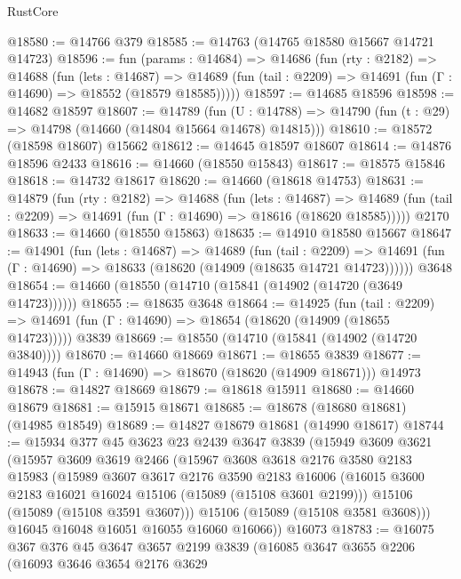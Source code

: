 \begin{lexlean}{RustCore}
\begin{coremodule}
@18580 := @14766 @379
@18585 := @14763 (@14765 @18580 @15667 @14721 @14723)
@18596 := fun (params : @14684) =>
  @14686
    (fun (rty : @2182) =>
    @14688
      (fun (lets : @14687) =>
      @14689 (fun (tail : @2209) => @14691 (fun (Γ : @14690) => @18552 (@18579 @18585)))))
@18597 := @14685 @18596
@18598 := @14682 @18597
@18607 := @14789
    (fun (U : @14788) => @14790 (fun (t : @29) => @14798 (@14660 (@14804 @15664 @14678) @14815)))
@18610 := @18572 (@18598 @18607) @15662
@18612 := @14645 @18597 @18607
@18614 := @14876 @18596 @2433
@18616 := @14660 (@18550 @15843)
@18617 := @18575 @15846
@18618 := @14732 @18617
@18620 := @14660 (@18618 @14753)
@18631 := @14879
    (fun (rty : @2182) =>
    @14688
      (fun (lets : @14687) =>
      @14689 (fun (tail : @2209) => @14691 (fun (Γ : @14690) => @18616 (@18620 @18585)))))
    @2170
@18633 := @14660 (@18550 @15863)
@18635 := @14910 @18580 @15667
@18647 := @14901
    (fun (lets : @14687) =>
    @14689
      (fun (tail : @2209) =>
      @14691 (fun (Γ : @14690) => @18633 (@18620 (@14909 (@18635 @14721 @14723))))))
    @3648
@18654 := @14660 (@18550 (@14710 (@15841 (@14902 (@14720 (@3649 @14723))))))
@18655 := @18635 @3648
@18664 := @14925
    (fun (tail : @2209) => @14691 (fun (Γ : @14690) => @18654 (@18620 (@14909 (@18655 @14723)))))
    @3839
@18669 := @18550 (@14710 (@15841 (@14902 (@14720 @3840))))
@18670 := @14660 @18669
@18671 := @18655 @3839
@18677 := @14943 (fun (Γ : @14690) => @18670 (@18620 (@14909 @18671))) @14973
@18678 := @14827 @18669
@18679 := @18618 @15911
@18680 := @14660 @18679
@18681 := @15915 @18671
@18685 := @18678 (@18680 @18681) (@14985 @18549)
@18689 := @14827 @18679 @18681 (@14990 @18617)
@18744 := @15934
    @377
    @45
    @3623
    @23
    @2439
    @3647
    @3839
    (@15949
      @3609
      @3621
      (@15957
        @3609
        @3619
        @2466
        (@15967
          @3608
          @3618
          @2176
          @3580
          @2183
          @15983
          (@15989
            @3607
            @3617
            @2176
            @3590
            @2183
            @16006
            (@16015 @3600 @2183 @16021 @16024 @15106 (@15089 (@15108 @3601 @2199)))
            @15106
            (@15089 (@15108 @3591 @3607)))
          @15106
          (@15089 (@15108 @3581 @3608)))
        @16045
        @16048
        @16051
        @16055
        @16060
        @16066))
    @16073
@18783 := @16075
    @367
    @376
    @45
    @3647
    @3657
    @2199
    @3839
    (@16085
      @3647
      @3655
      @2206
      (@16093
        @3646
        @3654
        @2176
        @3629

\end{coremodule}
\end{lexlean}
